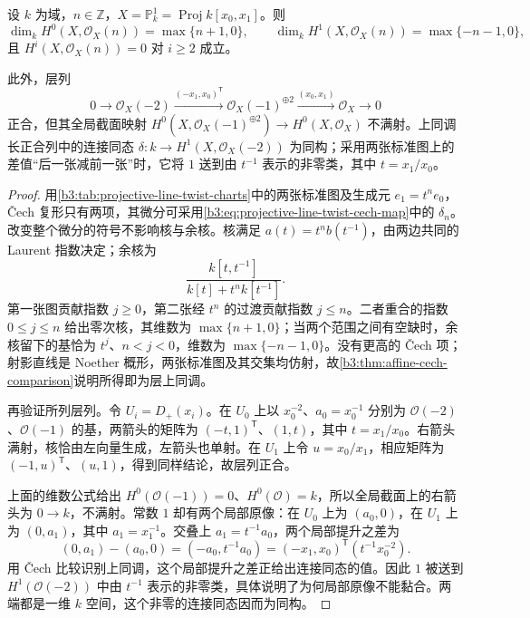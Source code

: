 \begin{proposition}\label{b3:prop:projective-line-cohomology}\label{b3:prop:projective-line-section-obstruction}
	设 \(k\) 为域，\(n\in\mathbb Z\)，\(X=\mathbb P_k^1=\operatorname{Proj}k[x_0,x_1]\)。则
	\[
		\dim_kH^0(X,\mathcal O_X(n))=\max\{n+1,0\},\qquad \dim_kH^1(X,\mathcal O_X(n))=\max\{-n-1,0\},
	\]
	且 \(H^i(X,\mathcal O_X(n))=0\) 对 \(i\ge2\) 成立。

	此外，层列
	\[
		0\longrightarrow\mathcal O_X(-2) \xrightarrow{(-x_1,x_0)^{\mathsf T}} \mathcal O_X(-1)^{\oplus2} \xrightarrow{(x_0,x_1)}\mathcal O_X\longrightarrow0
	\]
	正合，但其全局截面映射 \(H^0(X,\mathcal O_X(-1)^{\oplus2})\to H^0(X,\mathcal O_X)\) 不满射。上同调长正合列中的连接同态 \(\delta:k\to H^1(X,\mathcal O_X(-2))\) 为同构；采用两张标准图上的差值“后一张减前一张”时，它将 \(1\) 送到由 \(t^{-1}\) 表示的非零类，其中 \(t=x_1/x_0\)。
\end{proposition}
\begin{proof}
	用\cref{b3:tab:projective-line-twist-charts}中的两张标准图及生成元 \(e_1=t^ne_0\)，Čech 复形只有两项，其微分可采用\eqref{b3:eq:projective-line-twist-cech-map}中的 \(\delta_n\)。改变整个微分的符号不影响核与余核。核满足 \(a(t)=t^n b(t^{-1})\)，由两边共同的 Laurent 指数决定；余核为
	\[
		\frac{k[t,t^{-1}]}{k[t]+t^nk[t^{-1}]}.
	\]
	第一张图贡献指数 \(j\ge0\)，第二张经 \(t^n\) 的过渡贡献指数 \(j\le n\)。二者重合的指数 \(0\le j\le n\) 给出零次核，其维数为 \(\max\{n+1,0\}\)；当两个范围之间有空缺时，余核留下的基恰为 \(t^j\)、\(n<j<0\)，维数为 \(\max\{-n-1,0\}\)。没有更高的 Čech 项；射影直线是 Noether 概形，两张标准图及其交集均仿射，故\cref{b3:thm:affine-cech-comparison}说明所得即为层上同调。

	再验证所列层列。令 \(U_i=D_+(x_i)\)。在 \(U_0\) 上以 \(x_0^{-2}\)、\(a_0=x_0^{-1}\) 分别为 \(\mathcal O(-2)\)、\(\mathcal O(-1)\) 的基，两箭头的矩阵为 \((-t,1)^{\mathsf T}\)、\((1,t)\)，其中 \(t=x_1/x_0\)。右箭头满射，核恰由左向量生成，左箭头也单射。在 \(U_1\) 上令 \(u=x_0/x_1\)，相应矩阵为 \((-1,u)^{\mathsf T}\)、\((u,1)\)，得到同样结论，故层列正合。

	上面的维数公式给出 \(H^0(\mathcal O(-1))=0\)、\(H^0(\mathcal O)=k\)，所以全局截面上的右箭头为 \(0\to k\)，不满射。常数 \(1\) 却有两个局部原像：在 \(U_0\) 上为 \((a_0,0)\)，在 \(U_1\) 上为 \((0,a_1)\)，其中 \(a_1=x_1^{-1}\)。交叠上 \(a_1=t^{-1}a_0\)，两个局部提升之差为
	\[
		(0,a_1)-(a_0,0) =(-a_0,t^{-1}a_0) =(-x_1,x_0)^{\mathsf T}(t^{-1}x_0^{-2}).
	\]
	用 Čech 比较识别上同调，这个局部提升之差正给出连接同态的值。因此 \(1\) 被送到 \(H^1(\mathcal O(-2))\) 中由 \(t^{-1}\) 表示的非零类，具体说明了为何局部原像不能黏合。两端都是一维 \(k\) 空间，这个非零的连接同态因而为同构。
\end{proof}

